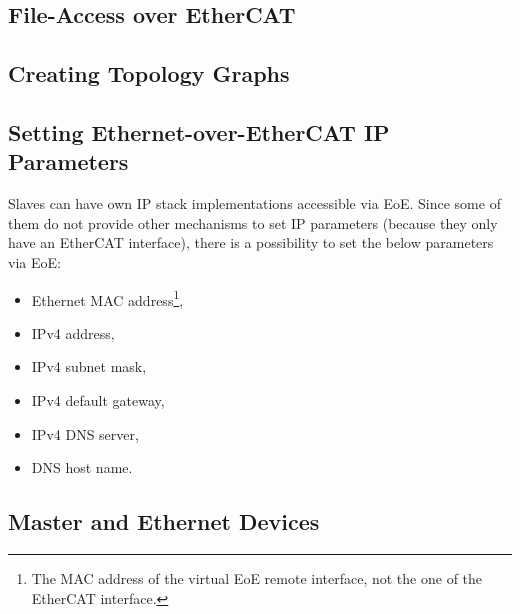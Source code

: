 \documentclass[a4paper,12pt,BCOR=6mm,bibtotoc,idxtotoc]{scrbook}
\begin{document}
\subsection{File-Access over EtherCAT}






\subsection{Creating Topology Graphs}




\subsection{Setting Ethernet-over-EtherCAT IP Parameters}
\label{sec:ipparam}

Slaves can have own IP stack implementations accessible via EoE. Since some of
them do not provide other mechanisms to set IP parameters (because they only
have an EtherCAT interface), there is a possibility to set the below
parameters via EoE:

\begin{itemize}
\item Ethernet MAC address\footnote{The MAC address of the virtual EoE remote
interface, not the one of the EtherCAT interface.},
\item IPv4 address,
\item IPv4 subnet mask,
\item IPv4 default gateway,
\item IPv4 DNS server,
\item DNS host name.
\end{itemize}




\subsection{Master and Ethernet Devices}
\end{document}
